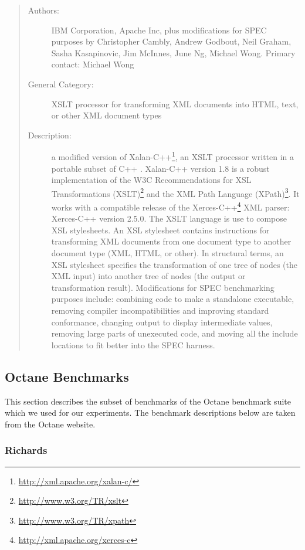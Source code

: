 \documentclass[onecolumn, openright, master, english, signatures]{dbrgrptt}
\begin{document}
\begin{quote}
\begin{description}
\item[Authors:] IBM Corporation, Apache Inc, plus modifications for SPEC purposes by Christopher Cambly, Andrew Godbout, Neil Graham, Sasha Kasapinovic, Jim McInnes, June Ng, Michael Wong. Primary contact: Michael Wong

\item[General Category:] XSLT processor for transforming XML documents into HTML, text, or other XML document types

\item[Description:] a modified version of Xalan-C++\footnote{\url{http://xml.apache.org/xalan-c/}}, an XSLT processor written in a portable subset of C++ . Xalan-C++ version 1.8 is a robust implementation of the W3C Recommendations for XSL Transformations (XSLT)\footnote{\url{http://www.w3.org/TR/xslt}} and the XML Path Language (XPath)\footnote{\url{http://www.w3.org/TR/xpath}}. It works with a compatible release of the Xerces-C++\footnote{\url{http://xml.apache.org/xerces-c}} XML parser: Xerces-C++ version 2.5.0. The XSLT language is use to compose XSL stylesheets. An XSL stylesheet contains instructions for transforming XML documents from one document type to another document type (XML, HTML, or other). In structural terms, an XSL stylesheet specifies the transformation of one tree of nodes (the XML input) into another tree of nodes (the output or transformation result).
Modifications for SPEC benchmarking purposes include: combining code to make a standalone executable, removing compiler incompatibilities and improving standard conformance, changing output to display intermediate values, removing large parts of unexecuted code, and moving all the include locations to fit better into the SPEC harness.
\end{description}
\end{quote}

\subsection{Octane Benchmarks}

This section describes the subset of benchmarks of the Octane benchmark suite \cite{v8benchmarks} which we used for our experiments. The benchmark descriptions below are taken from the Octane website.

\subsubsection{Richards}
\end{document}
